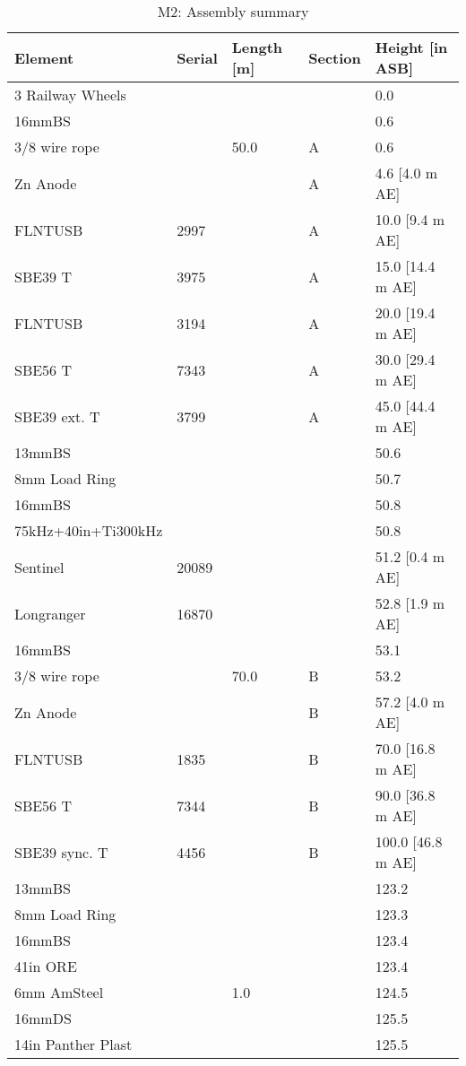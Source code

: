 \documentclass{article}
\begin{document}
\begin{table}[!htbp]
\centering
\caption{M2: Assembly summary}
\begin{tabular}{lllll}
\toprule
Element & Serial & Length [m] & Section & Height [in ASB] \\
\midrule
3 Railway Wheels &  &  &  & 0.0 \\
16mmBS &  &  &  & 0.6 \\
3/8 wire rope &  & 50.0 & A & 0.6 \\
Zn Anode &  &  & A & 4.6 [4.0 m AE] \\
FLNTUSB & 2997 &  & A & 10.0 [9.4 m AE] \\
SBE39 T & 3975 &  & A & 15.0 [14.4 m AE] \\
FLNTUSB & 3194 &  & A & 20.0 [19.4 m AE] \\
SBE56 T & 7343 &  & A & 30.0 [29.4 m AE] \\
SBE39 ext. T & 3799 &  & A & 45.0 [44.4 m AE] \\
13mmBS &  &  &  & 50.6 \\
8mm Load Ring &  &  &  & 50.7 \\
16mmBS &  &  &  & 50.8 \\
75kHz+40in+Ti300kHz &  &  &  & 50.8 \\
Sentinel & 20089 &  &  & 51.2 [0.4 m AE] \\
Longranger & 16870 &  &  & 52.8 [1.9 m AE] \\
16mmBS &  &  &  & 53.1 \\
3/8 wire rope &  & 70.0 & B & 53.2 \\
Zn Anode &  &  & B & 57.2 [4.0 m AE] \\
FLNTUSB & 1835 &  & B & 70.0 [16.8 m AE] \\
SBE56 T & 7344 &  & B & 90.0 [36.8 m AE] \\
SBE39 sync. T & 4456 &  & B & 100.0 [46.8 m AE] \\
13mmBS &  &  &  & 123.2 \\
8mm Load Ring &  &  &  & 123.3 \\
16mmBS &  &  &  & 123.4 \\
41in ORE &  &  &  & 123.4 \\
6mm AmSteel &  & 1.0 &  & 124.5 \\
16mmDS &  &  &  & 125.5 \\
14in Panther Plast &  &  &  & 125.5 \\
\bottomrule
\end{tabular}
\end{table}
\end{document}
